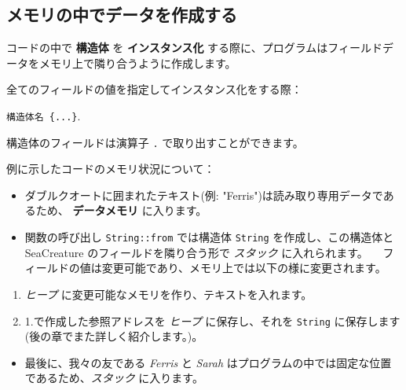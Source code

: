 \subsection{メモリの中でデータを作成する}

コードの中で \textbf{構造体} を \textbf{インスタンス化}
する際に、プログラムはフィールドデータをメモリ上で隣り合うように作成します。

全てのフィールドの値を指定してインスタンス化をする際：

\texttt{構造体名\ \{...\}}.

構造体のフィールドは演算子 \texttt{.} で取り出すことができます。

例に示したコードのメモリ状況について：

\begin{itemize}
\item
  ダブルクオートに囲まれたテキスト(例:
  "Ferris")は読み取り専用データであるため、 \textbf{データメモリ}
  に入ります。
\item
  関数の呼び出し \texttt{String::from} では構造体 \texttt{String}
  を作成し、この構造体と SeaCreature のフィールドを隣り合う形で
  \emph{スタック} に入れられます。
  　フィールドの値は変更可能であり、メモリ上では以下の様に変更されます。
\end{itemize}

\begin{enumerate}
\item
  \emph{ヒープ} に変更可能なメモリを作り、テキストを入れます。
\item
  1.で作成した参照アドレスを \emph{ヒープ} に保存し、それを
  \texttt{String} に保存します(後の章でまた詳しく紹介します。)。
\end{enumerate}

\begin{itemize}
\item
  最後に、我々の友である \emph{Ferris} と \emph{Sarah}
  はプログラムの中では固定な位置であるため、\emph{スタック} に入ります。
\end{itemize}

